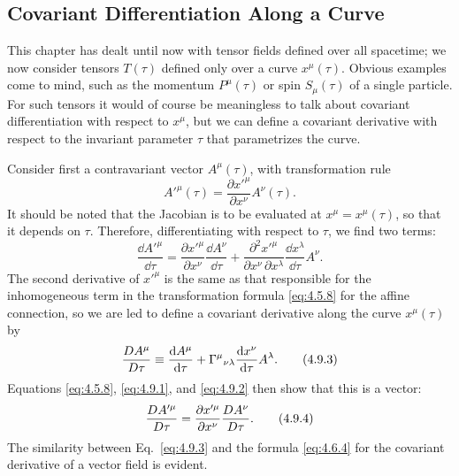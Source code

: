 
\subsection{Covariant Differentiation Along a Curve}\label{sec:4.9}

This chapter has dealt until now with tensor fields defined over all
spacetime; we now consider tensors \(T(\tau)\) defined only over a curve
\(x^\mu(\tau)\). Obvious examples come to mind, such as the momentum
\(P^\mu(\tau)\) or spin \(S_\mu(\tau)\) of a single particle. For such
tensors it would of course be meaningless to talk about covariant
differentiation with respect to \(x^\mu\), but we can define a covariant
derivative with respect to the invariant parameter \(\tau\) that parametrizes
the curve.

Consider first a contravariant vector \(A^\mu(\tau)\), with transformation
rule
\begin{equation}
  A'^\mu(\tau)
  =
  \frac{\partial x'^\mu}{\partial x^\nu}A^\nu(\tau).
  \tag{4.9.1}\label{eq:4.9.1}
\end{equation}
It should be noted that the Jacobian is to be evaluated at
\(x^\mu=x^\mu(\tau)\), so that it depends on \(\tau\). Therefore,
differentiating with respect to \(\tau\), we find two terms:
\begin{equation}
  \frac{\dd A'^\mu}{\dd\tau}
  =
  \frac{\partial x'^\mu}{\partial x^\nu}
  \frac{\dd A^\nu}{\dd\tau}
  +
  \frac{\partial^2x'^\mu}
       {\partial x^\nu\,\partial x^\lambda}
  \frac{\dd x^\lambda}{\dd\tau}A^\nu.
  \tag{4.9.2}\label{eq:4.9.2}
\end{equation}
The second derivative of \(x'^\mu\) is the same as that responsible for the
inhomogeneous term in the transformation formula \eqref{eq:4.5.8} for the
affine connection, so we are led to define a covariant derivative along the
curve \(x^\mu(\tau)\) by
\begin{equation}
  \frac{D A^\mu}{D\tau}
  \equiv
  \frac{\mathop{}\!\mathrm{d} A^\mu}{\mathop{}\!\mathrm{d}\tau}
  +
  \Gamma^\mu{}_{\nu\lambda}
  \frac{\mathop{}\!\mathrm{d} x^\nu}{\mathop{}\!\mathrm{d}\tau}A^\lambda.
  \tag{4.9.3}\label{eq:4.9.3}
\end{equation}
Equations \eqref{eq:4.5.8}, \eqref{eq:4.9.1}, and \eqref{eq:4.9.2} then
show that this is a vector:
\begin{equation}
  \frac{D A'^\mu}{D\tau}
  =
  \frac{\partial x'^\mu}{\partial x^\nu}
  \frac{D A^\nu}{D\tau}.
  \tag{4.9.4}\label{eq:4.9.4}
\end{equation}
The similarity between Eq.~\eqref{eq:4.9.3} and the formula
\eqref{eq:4.6.4} for the covariant derivative of a vector field is evident.

